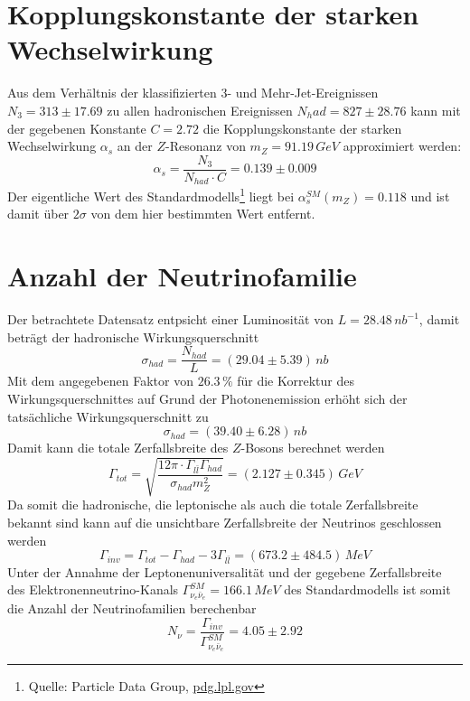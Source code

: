 \documentclass{include/thesisclass3}
\newcommand{\cc}{\cdot}
\newcommand{\e}[1]{\,\si{#1}}
\begin{document}
\section{Kopplungskonstante der starken Wechselwirkung}
Aus dem Verhältnis der klassifizierten $3$- und Mehr-Jet-Ereignissen $N_3 = 313 \pm 17.69$ zu allen hadronischen Ereignissen $N_had = 827 \pm 28.76$ kann mit der gegebenen Konstante $C = 2.72$ die Kopplungskonstante der starken Wechselwirkung $\alpha_s$ an der $Z$-Resonanz von $m_Z = 91.19\e{GeV}$ approximiert werden:
\[ \alpha_s = \frac{ N_3}{N_{had} \cc C} = 0.139\pm 0.009 \]
Der eigentliche Wert des Standardmodells\footnote{Quelle: Particle Data Group, \url{pdg.lpl.gov}} liegt bei $\alpha_s^{SM}(m_Z) = 0.118$ und ist damit über $2\sigma$ von dem hier bestimmten Wert entfernt.

\section{Anzahl der Neutrinofamilie}
Der betrachtete Datensatz entpsicht einer Luminosität von $L = 28.48\e{nb^{-1}}$, damit beträgt der hadronische Wirkungsquerschnitt
\[\sigma_{had} = \frac{ N_{had}}{L} = (29.04 \pm 5.39)\e{nb}\]
Mit dem angegebenen Faktor von $26.3\e{\%}$ für die Korrektur des Wirkungsquerschnittes auf Grund der Photonenemission erhöht sich der tatsächliche Wirkungsquerschnitt zu
\[\sigma_{had} = (39.40 \pm 6.28)\e{nb}\]
Damit kann die totale Zerfallsbreite des $Z$-Bosons berechnet werden
\[\Gamma_{tot} = \sqrt{ \frac{ 12 \pi \cc \Gamma_{l \bar l} \Gamma_{had}}{\sigma_{had} m_Z^2}} = (2.127 \pm 0.345)\e{GeV}\]
Da somit die hadronische, die leptonische als auch die totale Zerfallsbreite bekannt sind kann auf die unsichtbare Zerfallsbreite der Neutrinos geschlossen werden
\[\Gamma_{inv} = \Gamma_{tot} - \Gamma_{had} - 3 \Gamma_{l\bar l} = (673.2\pm 484.5)\e{MeV}\]
Unter der Annahme der Leptonenuniversalität und der gegebene Zerfallsbreite des Elektronenneutrino-Kanals $\Gamma^{SM}_{\nu_e \bar \nu_e}=166.1\e{MeV}$ des Standardmodells ist somit die Anzahl der Neutrinofamilien berechenbar
\[N_\nu = \frac{\Gamma_{inv}}{\Gamma_{\nu_e \bar \nu_e}^{SM}} = 4.05\pm 2.92\]
\end{document}
